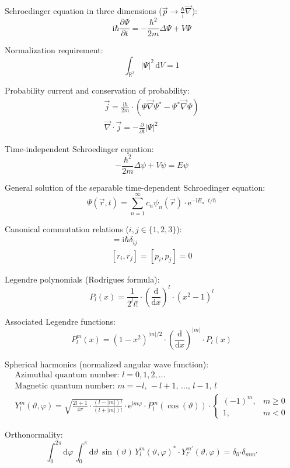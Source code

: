 \documentclass[fontsize=11pt,a4paper]{scrartcl}
\begin{document}
Schroedinger equation in three dimensions ($\vec p\to\frac{\hbar}{\mathrm{i}}\vec\nabla$):
\[
	\mathrm{i}\hbar\frac{\partial\Psi}{\partial t}=-\frac{\hbar^2}{2m}\Delta\Psi + V\Psi
\]

Normalization requirement:
\[
	\int_{\mathbb{R}^3}|\Psi|^2\,\mathrm{d}V=1
\]

Probability current and conservation of probability:
\begin{gather*}
	\vec j=\frac{\mathrm{i}\hbar}{2m}\cdot(\Psi\vec\nabla\Psi^* - \Psi^* \vec\nabla\Psi)\\
	\vec\nabla\cdot\vec j=-\frac{\partial}{\partial t}|\Psi|^2
\end{gather*}

Time-independent Schroedinger equation:
\[
	-\frac{\hbar^2}{2m}\Delta\psi + V\psi=E\psi
\]

General solution of the separable time-dependent Schroedinger equation:
\[
	\Psi(\vec r,t)=\sum_{n=1}^\infty c_n\psi_n(\vec r)\cdot\mathrm{e}^{-\mathrm{i}E_n\cdot t/\hbar}
\]

Canonical commutation relations ($i,j\in\{1,2,3\}$):
\begin{gather*}
	[r_i,p_j]=\mathrm{i}\hbar\delta_{ij}\\
	[r_i,r_j]=[p_i,p_j]=0
\end{gather*}

Legendre polynomials (Rodrigues formula):
\[
	P_l(x)=\frac{1}{2^l l!}\cdot\left(\frac{\mathrm{d}}{\mathrm{d}x}\right)^l \cdot(x^2-1)^l
\]

Associated Legendre functions:
\[
	P_l^m(x)=(1-x^2)^{|m|/2}\cdot\left(\frac{\mathrm{d}}{\mathrm{d}x}\right)^{|m|}\cdot P_l(x)
\]

Spherical harmonics (normalized angular wave function):
\begin{gather*}
	\text{Azimuthal quantum number: } l=0,1,2,\dots\\
	\text{Magnetic quantum number: } m=-l,\,-l+1,\,\dots,\,l-1,\,l\\
	Y_l^m(\vartheta,\varphi)=\sqrt{\frac{2l+1}{4\pi}\cdot\frac{(l-|m|)!}{(l+|m|)!}}
		\cdot\mathrm{e}^{\mathrm{i}m\varphi}\cdot P_l^m\left(\cos(\vartheta)\right)
		\cdot\begin{cases}(-1)^m, &m\ge 0\\ 1, &m<0\end{cases}
\end{gather*}

Orthonormality:
\[
	\int_0^{2\pi}\mathrm{d}\varphi\,\int_0^\pi\mathrm{d}\vartheta\,\sin(\vartheta)\,
		Y_l^m(\vartheta,\varphi)^*\cdot Y_{l'}^{m'}(\vartheta,\varphi)=\delta_{ll'}\delta_{mm'}
\]
\end{document}
